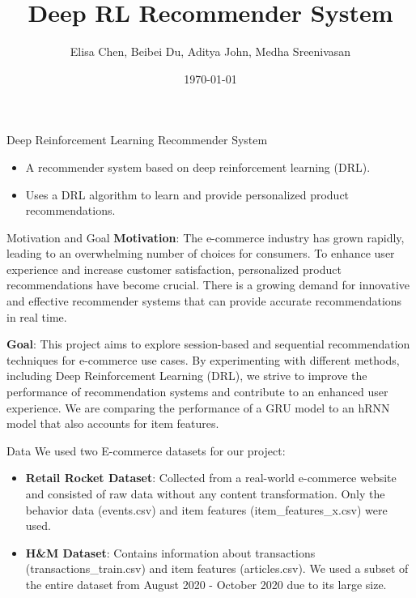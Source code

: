 \documentclass{beamer}
\title{Deep RL Recommender System}
\author{Elisa Chen, Beibei Du, Aditya John, Medha Sreenivasan}
\date{\today}
\begin{document}
\begin{frame}
  \titlepage
\end{frame}

\begin{frame}{Deep Reinforcement Learning Recommender System}
  \begin{itemize}
    \item A recommender system based on deep reinforcement learning (DRL).
    \item Uses a DRL algorithm to learn and provide personalized product recommendations.
  \end{itemize}
\end{frame}

\begin{frame}{Motivation and Goal}
\textbf{Motivation}: The e-commerce industry has grown rapidly, leading to an overwhelming number of choices for consumers. To enhance user experience and increase customer satisfaction, personalized product recommendations have become crucial. There is a growing demand for innovative and effective recommender systems that can provide accurate recommendations in real time.

\textbf{Goal}: This project aims to explore session-based and sequential recommendation techniques for e-commerce use cases. By experimenting with different methods, including Deep Reinforcement Learning (DRL), we strive to improve the performance of recommendation systems and contribute to an enhanced user experience. We are comparing the performance of a GRU model to an hRNN model that also accounts for item features.
\end{frame}

\begin{frame}{Data}
We used two E-commerce datasets for our project:
\begin{itemize}
\item \textbf{Retail Rocket Dataset}: Collected from a real-world e-commerce website and consisted of raw data without any content transformation. Only the behavior data (events.csv) and item features (item\_features\_x.csv) were used.
\item \textbf{H\&M Dataset}: Contains information about transactions (transactions\_train.csv) and item features (articles.csv). We used a subset of the entire dataset from August 2020 - October 2020 due to its large size.
\end{itemize}
\end{frame}
\end{document}
